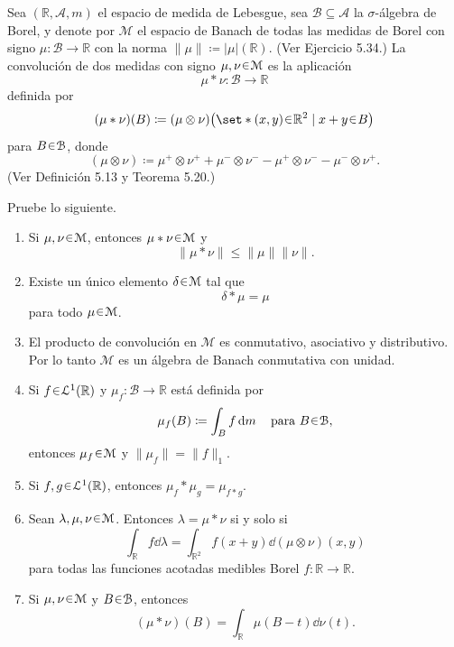 \setcounter{neje}{53}
\begin{nejer}
Sea $(\mathbb{R}, \mathcal{A}, m)$ el espacio de medida de Lebesgue, sea $\mathcal{B} \subseteq \mathcal{A}$ la $\sigma$-álgebra de Borel, y denote por $\mathcal{M}$ el espacio de Banach de todas las medidas de Borel con signo $\mu \colon \mathcal{B} \to \mathbb{R}$ con la norma $\|\mu\| \coloneq |\mu|(\mathbb{R})$. (Ver Ejercicio 5.34.) La convolución de dos medidas con signo $\mu, \nu \en \mathcal{M}$ es la aplicación
$$
\mu * \nu \colon \mathcal{B} \to \mathbb{R}
$$
definida por
$$
(\mu * \nu)(B) \coloneq (\mu \otimes \nu)\bigl(\set*{(x, y) \en \mathbb{R}^2 \mid x + y \en B}\bigr)
$$
para $B \en \mathcal{B}$, donde
$$
(\mu \otimes \nu) \coloneq \mu^+ \otimes \nu^+ + \mu^- \otimes \nu^- - \mu^+ \otimes \nu^- - \mu^- \otimes \nu^+.
$$
(Ver Definición 5.13 y Teorema 5.20.)

Pruebe lo siguiente.
\begin{enumerate}[label = (\roman*)]
    \item Si $\mu, \nu \en \mathcal{M}$, entonces $\mu * \nu \en \mathcal{M}$ y
    $$
    \|\mu * \nu\| \le \|\mu\| \|\nu\|.
    $$
    \item Existe un único elemento $\delta \en \mathcal{M}$ tal que
    $$
    \delta * \mu = \mu
    $$
    para todo $\mu \en \mathcal{M}$.
    \item El producto de convolución en $\mathcal{M}$ es conmutativo, asociativo y distributivo. Por lo tanto $\mathcal{M}$ es un álgebra de Banach conmutativa con unidad.
    \item Si $f \en \mathcal{L}^1(\mathbb{R})$ y $\mu_f \colon \mathcal{B} \to \mathbb{R}$ está definida por
    $$
    \mu_f(B) \coloneq \int_B f \dd{m} \quad \text{para } B \en \mathcal{B},
    $$
    entonces $\mu_f \en \mathcal{M}$ y $\|\mu_f\| = \|f\|_1$.
    \item Si $f, g \en \mathcal{L}^1(\mathbb{R})$, entonces $\mu_f * \mu_g = \mu_{f * g}$.
    \item Sean $\lambda, \mu, \nu \en \mathcal{M}$. Entonces $\lambda = \mu * \nu$ si y solo si
    $$
    \int_{\mathbb{R}} f \dd{\lambda} = \int_{\mathbb{R}^2} f(x + y) \dd{(\mu \otimes \nu)(x, y)}
    $$
    para todas las funciones acotadas medibles Borel $f \colon \mathbb{R} \to \mathbb{R}$.
    \item Si $\mu, \nu \en \mathcal{M}$ y $B \en \mathcal{B}$, entonces
    $$
    (\mu * \nu)(B) = \int_{\mathbb{R}} \mu(B - t) \dd{\nu(t)}.
    $$
\end{enumerate}
\end{nejer}
